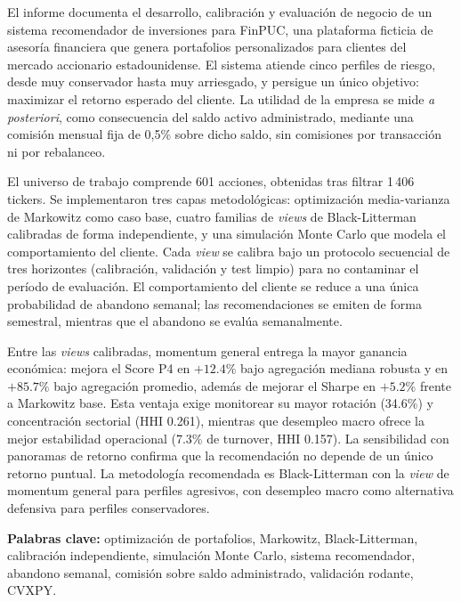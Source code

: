 El informe documenta el desarrollo, calibraci\'on y evaluaci\'on de negocio de un
sistema recomendador de inversiones para FinPUC, una plataforma ficticia de
asesor\'ia financiera que genera portafolios personalizados para clientes del
mercado accionario estadounidense. El sistema atiende cinco perfiles de riesgo,
desde muy conservador hasta muy arriesgado, y persigue un \'unico objetivo:
maximizar el retorno esperado del cliente. La utilidad de la empresa se mide
\emph{a posteriori}, como consecuencia del saldo activo administrado, mediante
una comisi\'on mensual fija de 0,5\% sobre dicho saldo, sin comisiones por
transacci\'on ni por rebalanceo.

El universo de trabajo comprende 601 acciones, obtenidas tras filtrar 1\,406
tickers. Se implementaron tres capas metodol\'ogicas: optimizaci\'on
media-varianza de Markowitz como caso base, cuatro familias de \textit{views} de
Black-Litterman calibradas de forma independiente, y una simulaci\'on Monte Carlo
que modela el comportamiento del cliente. Cada \textit{view} se calibra bajo un
protocolo secuencial de tres horizontes (calibraci\'on, validaci\'on y test
limpio) para no contaminar el per\'iodo de evaluaci\'on. El comportamiento del
cliente se reduce a una \'unica probabilidad de abandono semanal; las
recomendaciones se emiten de forma semestral, mientras que el abandono se
eval\'ua semanalmente.

Entre las \textit{views} calibradas, momentum general entrega la mayor ganancia
econ\'omica: mejora el Score P4 en $+12.4\%$ bajo agregaci\'on mediana robusta y
en $+85.7\%$ bajo agregaci\'on promedio, adem\'as de mejorar el Sharpe en
$+5.2\%$ frente a Markowitz base. Esta ventaja exige monitorear su mayor
rotaci\'on (34.6\%) y concentraci\'on sectorial (HHI 0.261), mientras que
desempleo macro ofrece la mejor estabilidad operacional (7.3\% de turnover,
HHI 0.157). La sensibilidad con panoramas de retorno confirma que la
recomendaci\'on no depende de un \'unico retorno puntual. La metodolog\'ia
recomendada es Black-Litterman con la \textit{view} de momentum general para
perfiles agresivos, con desempleo macro como alternativa defensiva para perfiles
conservadores.

\textbf{Palabras clave:} optimizaci\'on de portafolios, Markowitz,
Black-Litterman, calibraci\'on independiente, simulaci\'on Monte Carlo, sistema
recomendador, abandono semanal, comisi\'on sobre saldo administrado, validaci\'on
rodante, CVXPY.
